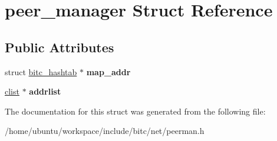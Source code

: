 \hypertarget{structpeer__manager}{\section{peer\-\_\-manager Struct Reference}
\label{structpeer__manager}
}
\subsection*{Public Attributes}
\begin{DoxyCompactItemize}
\item 
\hypertarget{structpeer__manager_a3e029191ee35a494f120cc39595a92c8}{struct \hyperlink{structbitc__hashtab}{bitc\-\_\-hashtab} $\ast$ {\bfseries map\-\_\-addr}}\label{structpeer__manager_a3e029191ee35a494f120cc39595a92c8}

\item 
\hypertarget{structpeer__manager_a7e856c674bbb63b009b3a1f78744b0e6}{\hyperlink{structclist}{clist} $\ast$ {\bfseries addrlist}}\label{structpeer__manager_a7e856c674bbb63b009b3a1f78744b0e6}

\end{DoxyCompactItemize}


The documentation for this struct was generated from the following file\-:\begin{DoxyCompactItemize}
\item 
/home/ubuntu/workspace/include/bitc/net/peerman.\-h\end{DoxyCompactItemize}
